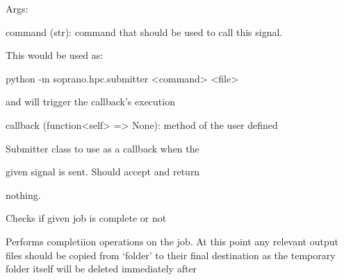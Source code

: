 \documentclass[letterpaper,10pt,english]{sphinxmanual}
\begin{document}
\begin{fulllineitems}
\begin{fulllineitems}
\begin{DUlineblock}{0em}
\item[] Args:
\item[]
\begin{DUlineblock}{\DUlineblockindent}
\item[] command (str): command that should be used to call this signal.
\item[]
\begin{DUlineblock}{\DUlineblockindent}
\item[] This would be used as:
\item[] python -m soprano.hpc.submitter \textless{}command\textgreater{} \textless{}file\textgreater{}
\item[] and will trigger the callback's execution
\end{DUlineblock}
\item[] callback (function\textless{}self\textgreater{} =\textgreater{} None): method of the user defined
\item[]
\begin{DUlineblock}{\DUlineblockindent}
\item[] Submitter class to use as a callback when the
\item[] given signal is sent. Should accept and return
\item[] nothing.
\end{DUlineblock}
\end{DUlineblock}
\end{DUlineblock}

\end{fulllineitems}


\begin{fulllineitems}
\label{doctree/soprano.hpc.submitter.submit:soprano.hpc.submitter.submit.Submitter.check_job}
Checks if given job is complete or not

\end{fulllineitems}


\begin{fulllineitems}
\label{doctree/soprano.hpc.submitter.submit:soprano.hpc.submitter.submit.Submitter.finish_job}
Performs completiion operations on the job. At this point any
relevant output files should be copied from `folder' to their final
destination as the temporary folder itself will be deleted immediately
after


\end{fulllineitems}
\end{fulllineitems}
\end{document}
